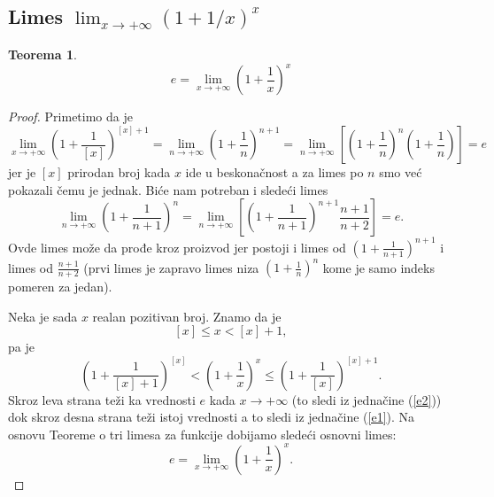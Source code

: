 \documentclass[a4paper,12pt]{article}
\theoremstyle{plain}
\newtheorem{theorem}{Teorema}[section]
\theoremstyle{definition}
\theoremstyle{remark}
\begin{document}
\subsection{Limes \texorpdfstring{$\displaystyle\lim_{x\to+\infty} (1 + 1/x)^x$}{lim(1+1/x)\textasciicircum x}}
\begin{theorem}
    \[e = \lim_{x \to +\infty} \left(1 + \frac{1}{x}\right)^x\]
\end{theorem}
\begin{proof}
Primetimo da je
\begin{equation}
    \label{e1}
    \lim_{x \to +\infty} \left(1 + \frac{1}{[x]}\right)^{[x]+1} = \lim_{n \to +\infty} \left(1 + \frac{1}{n}\right)^{n+1} = \lim_{n \to +\infty} \left[ \left(1 + \frac{1}{n}\right)^n \left(1 + \frac{1}{n}\right) \right] = e
\end{equation}
jer je $[x]$ prirodan broj kada $x$ ide u beskonačnost a za limes po $n$ smo već pokazali čemu je jednak. Biće nam potreban i sledeći limes
\begin{equation}
    \label{e2}
    \lim_{n \to +\infty} \left(1 + \frac{1}{n+1}\right)^n = \lim_{n \to +\infty} \left[ \left(1 + \frac{1}{n+1}\right)^{n+1} \frac{n+1}{n+2} \right] = e.
\end{equation}
Ovde limes može da prođe kroz proizvod jer postoji i limes od $\left(1 + \frac{1}{n+1}\right)^{n+1}$ i limes od $\frac{n+1}{n+2}$ (prvi limes je zapravo limes niza $\left(1 + \frac{1}{n}\right)^n$ kome je samo indeks pomeren za jedan).

Neka je sada $x$ realan pozitivan broj. Znamo da je
\[ [x] \le x < [x] + 1, \]
pa je
\[ \left(1 + \frac{1}{[x]+1}\right)^{[x]} < \left(1 + \frac{1}{x}\right)^x \le \left(1 + \frac{1}{[x]}\right)^{[x]+1}. \]
Skroz leva strana teži ka vrednosti $e$ kada $x \to +\infty$ (to sledi iz jednačine (\ref{e2})) dok skroz desna strana teži istoj vrednosti a to sledi iz jednačine (\ref{e1}). Na osnovu Teoreme o tri limesa za funkcije dobijamo sledeći osnovni limes:
\begin{equation}
    \label{e3}
    \boxed{e = \lim_{x \to +\infty} \left(1 + \frac{1}{x}\right)^x.}
\end{equation}
\end{proof}
\end{document}
